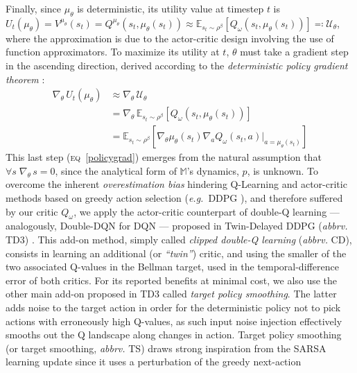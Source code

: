 Finally, since $\mu_\theta$ is deterministic, its utility value at timestep $t$ is
$U_t(\mu_\theta) = V^{\mu_\theta}(s_t)
= Q^{\mu_\theta}(s_t, \mu_\theta(s_t))
\approx \mathbb{E}_{s_t \sim \rho^\beta}[Q_\omega(s_t, \mu_\theta(s_t))]
\eqqcolon \mathcal{U}_\theta$,
where the approximation is
due to the actor-critic design involving the use of function approximators.
To maximize its utility at $t$, $\theta$ must take a gradient step in the ascending direction,
derived according to the
\emph{deterministic policy gradient theorem} \cite{Silver2014-dk}:
\begin{align}
\nabla_\theta \, U_t(\mu_\theta)
&\approx \nabla_\theta \, \mathcal{U}_\theta \label{thetautil} \\
&=\nabla_\theta \, \mathbb{E}_{s_t \sim \rho^\beta}
[Q_\omega(s_t, \mu_\theta(s_t))] \\
&=\mathbb{E}_{s_t \sim \rho^\beta}[
\nabla_\theta \mu_\theta(s_t) \nabla_a Q_\omega (s_t, a) \rvert_{a = \mu_\theta(s_t)}]
\label{policygrad}
\end{align}
This last step (\textsc{eq}~\ref{policygrad}) emerges from the natural
assumption that  $\forall s \; \nabla_\theta \, s = 0$,
since the analytical form of $\mathbb{M}$'s dynamics, $p$, is unknown.
To overcome the inherent \emph{overestimation bias} \cite{Thrun1993-or}
hindering Q-Learning and actor-critic methods based on greedy action selection
(\textit{e.g.}~DDPG \cite{Lillicrap2016-xa}),
and therefore suffered by our critic $Q_\omega$,
we apply the actor-critic counterpart of double-Q learning \cite{Van_Hasselt2010-qk}
--- analogously, Double-DQN \cite{Van_Hasselt2015-uc} for DQN ---
proposed in Twin-Delayed DDPG (\textit{abbrv.} TD3) \cite{Fujimoto2018-pe}.
This add-on method, simply called \emph{clipped double-Q learning} (\textit{abbrv.} CD),
consists in learning an additional (or \textit{``twin''}) critic,
and using the smaller of the two associated Q-values in the Bellman target,
used in the temporal-difference error of both critics.
For its reported benefits at minimal cost,
we also use the other main add-on proposed in TD3 \cite{Fujimoto2018-pe}
called \emph{target policy smoothing}.
The latter adds noise to the target action
in order for the deterministic policy not to pick actions with erroneously high Q-values,
as such input noise injection effectively smooths out the Q landscape along changes in action.
Target policy smoothing (or target smoothing, \textit{abbrv.} TS)
draws strong inspiration from the SARSA \cite{Sutton1998-ow} learning update
since it uses a perturbation of the greedy next-action
